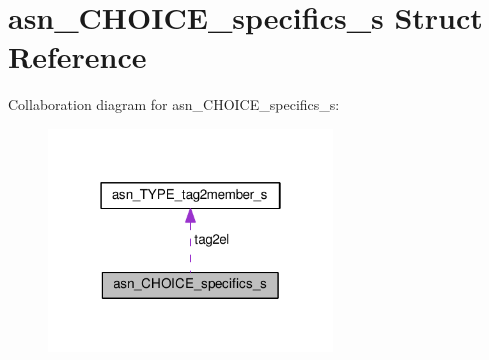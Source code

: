 \hypertarget{structasn__CHOICE__specifics__s}{}\section{asn\+\_\+\+C\+H\+O\+I\+C\+E\+\_\+specifics\+\_\+s Struct Reference}
\label{structasn__CHOICE__specifics__s}


Collaboration diagram for asn\+\_\+\+C\+H\+O\+I\+C\+E\+\_\+specifics\+\_\+s\+:\nopagebreak
\begin{figure}[H]
\begin{center}
\leavevmode
\includegraphics[width=214pt]{structasn__CHOICE__specifics__s__coll__graph}
\end{center}
\end{figure}
